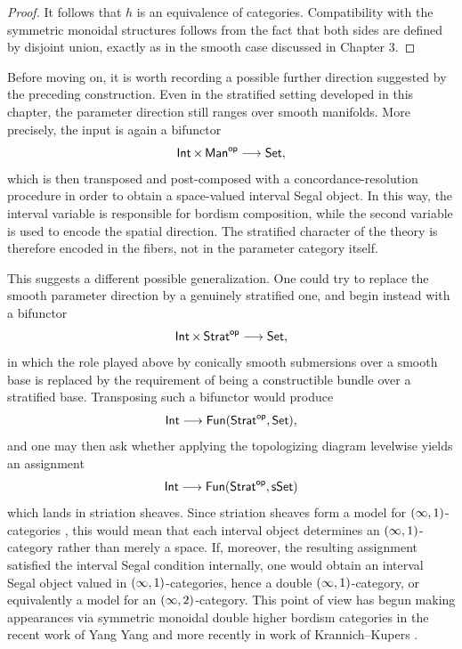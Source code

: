 \begin{proof}
    It follows that $h$ is an equivalence of categories. Compatibility with the symmetric monoidal structures follows from the fact that both sides are defined by disjoint union, exactly as in the smooth case discussed in Chapter 3.
\end{proof}

\begin{remark}
    Before moving on, it is worth recording a possible further direction suggested by the preceding construction. Even in the stratified setting developed in this chapter, the parameter direction still ranges over smooth manifolds. More precisely, the input is again a bifunctor
    \begin{equation}
        \operatorname{\mathsf{Int}} \times \operatorname{\sf Man}^{\mathsf{op}} \longrightarrow \operatorname{{\mathsf{Set}}},
    \end{equation}
    which is then transposed and post-composed with a concordance-resolution procedure in order to obtain a space-valued interval Segal object. In this way, the interval variable is responsible for bordism composition, while the second variable is used to encode the spatial direction. The stratified character of the theory is therefore encoded in the fibers, not in the parameter category itself.

    This suggests a different possible generalization. One could try to replace the smooth parameter direction by a genuinely stratified one, and begin instead with a bifunctor
    \begin{equation}
        \operatorname{\mathsf{Int}} \times \operatorname{\mathsf{Strat}}^{\mathsf{op}}\longrightarrow \operatorname{{\mathsf{Set}}},
    \end{equation}
    in which the role played above by conically smooth submersions over a smooth base is replaced by the requirement of being a constructible bundle over a stratified base. Transposing such a bifunctor would produce
    \begin{equation}
        \operatorname{\mathsf{Int}} \longrightarrow \operatorname{{\sf Fun}}(\operatorname{\mathsf{Strat}}^{\mathsf{op}},\operatorname{{\mathsf{Set}}}),
    \end{equation}
    and one may then ask whether applying the topologizing diagram levelwise yields an assignment
    \begin{equation}
        \operatorname{\mathsf{Int}} \longrightarrow \operatorname{{\sf Fun}}(\operatorname{\mathsf{Strat}}^{\mathsf{op}},\operatorname{\sf sSet})
    \end{equation}
    which lands in striation sheaves. Since striation sheaves form a model for $(\operatorname{\infty},1)$-categories \cite{AFR1}, this would mean that each interval object determines an $(\operatorname{\infty},1)$-category rather than merely a space. If, moreover, the resulting assignment satisfied the interval Segal condition internally, one would obtain an interval Segal object valued in $(\operatorname{\infty},1)$-categories, hence a double $(\operatorname{\infty},1)$-category, or equivalently a model for an $(\operatorname{\infty},2)$-category. This point of view has begun making appearances via symmetric monoidal double higher bordism categories in the recent work of Yang Yang \cite{YY22} and more recently in work of Krannich--Kupers \cite{Ku22}.


\end{remark}
